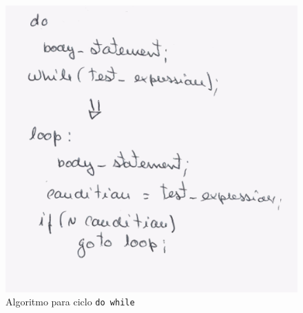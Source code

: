 \begin{figure}[<+htpb+>]
	\centering
	\includegraphics[scale=0.75]{./report/img/dowhile.png}
	\caption{Algoritmo para ciclo \texttt{do while}}
\label{fig:figure1}
\end{figure}
